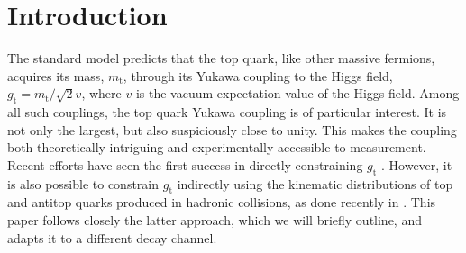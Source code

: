 \section{Introduction}
\label{S:intro}

The standard model predicts that the top quark, like other massive fermions,  acquires its mass, $m_\mathrm{t}$, through its Yukawa coupling to the Higgs field, $g_\mathrm{t}=m_\mathrm{t}/\sqrt{2}v$, where $v$ is the vacuum expectation value of the Higgs field. Among all such couplings, the top quark Yukawa coupling  is of particular interest. It is not only the largest, but also suspiciously close to unity. This makes the coupling both theoretically intriguing and experimentally accessible to measurement. Recent efforts have seen the first success in directly constraining $g_\mathrm{t}$ \cite{ttH}. However, it is also possible to constrain $g_\mathrm{t}$ indirectly using the kinematic distributions of top and antitop quarks produced in hadronic collisions, as done recently in \cite{ytpaper}. This paper follows closely the latter approach, which we will briefly outline, and adapts it to a different \ttbar decay channel.

